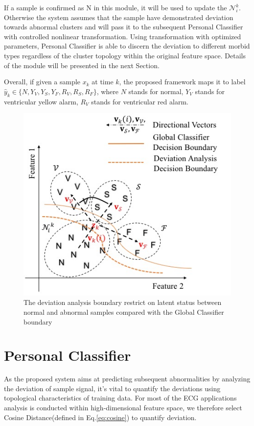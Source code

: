 If a sample is confirmed as N in this module, it will be used to update the $\mathcal{N}_i^k$. Otherwise the system assumes that the sample have demonstrated deviation towards abnormal clusters and will pass it to the subsequent Personal Classifier with controlled nonlinear transformation. Using transformation with optimized parameters, Personal Classifier is able to discern the deviation to different morbid types regardless of the cluster topology within the original feature space. Details of the module will be presented in the next Section.

Overall, if given a sample $x_k$ at time $k$, the proposed framework maps it to label $\hat{y}_k \in \{N,Y_V,Y_S,Y_F,R_V,R_S,R_F\}$, where $N$ stands for normal, $Y_V$ stands for ventricular yellow alarm, $R_V$ stands for ventricular red alarm.

\begin{figure}[t]
\centering
\includegraphics[scale=.7]{Fig/topology.jpg}
\caption{The deviation analysis boundary restrict on latent status between normal and abnormal samples compared with the Global Classifier boundary}
\label{fig:topo_deviation}
\end{figure}


\section{Personal Classifier}

As the proposed system aims at predicting subsequent abnormalities by analyzing the deviation of sample signal, it's vital to quantify the deviations using topological characteristics of training data. For most of the ECG applications analysis is conducted within high-dimensional feature space, we therefore select Cosine Distance(defined in Eq.\ref{eq:cosine}) to quantify deviation.

